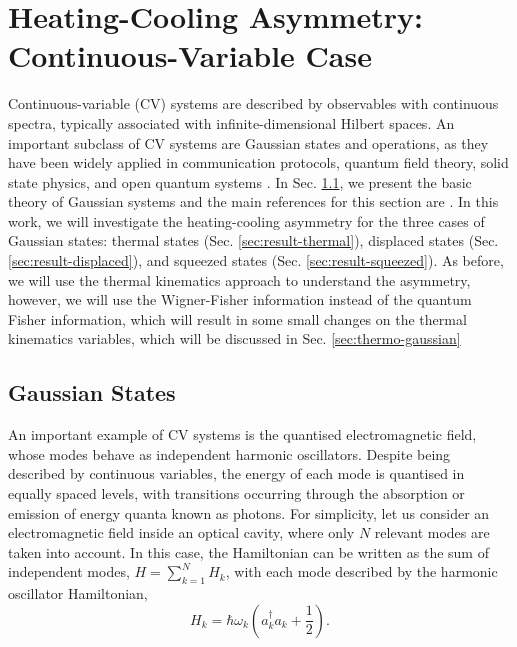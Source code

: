 

\chapter{Heating-Cooling Asymmetry: Continuous-Variable Case}\label{cap:results-continuous}

Continuous-variable (CV) systems are described by observables with continuous spectra, typically associated with infinite-dimensional Hilbert spaces. An important subclass of CV systems are Gaussian states and operations, as they have been widely applied in communication protocols, quantum field theory, solid state physics, and open quantum systems \cite{adesso-2016}. In Sec. \ref{sec:gaussian}, we present the basic theory of Gaussian systems and the main references for this section are \cite{adesso-2016, serafini-book}. In this work, we will investigate the heating-cooling asymmetry for the three cases of Gaussian states: thermal states (Sec. \ref{sec:result-thermal}), displaced states (Sec. \ref{sec:result-displaced}), and squeezed states (Sec. \ref{sec:result-squeezed}). As before, we will use the thermal kinematics approach to understand the asymmetry, however, we will use the Wigner-Fisher information instead of the quantum Fisher information, which will result in some small changes on the thermal kinematics variables, which will be discussed in Sec. \ref{sec:thermo-gaussian}


\section{Gaussian States}\label{sec:gaussian}


 
An important example of CV systems is the quantised electromagnetic field, whose modes behave as independent harmonic oscillators. Despite being described by continuous variables, the energy of each mode is quantised in equally spaced levels, with transitions occurring through the absorption or emission of energy quanta known as photons. For simplicity, let us consider an electromagnetic field inside an optical cavity, where only $N$ relevant modes are taken into account. In this case, the Hamiltonian can be written as the sum of independent modes, $H = \sum_{k=1}^{N} H_k$, with each mode described by the harmonic oscillator Hamiltonian,
\begin{equation}
    H_k = \hbar \omega_k \left( {a}_k^\dagger {a}_k + \frac{1}{2} \right).
    \label{eq:k-harmonic-oscillator}
\end{equation}

